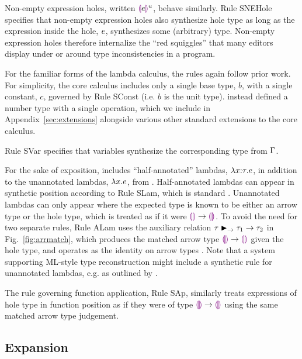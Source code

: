Non-empty expression holes, written $\textcolor{violet}{\llparenthesis}e\textcolor{violet}{\rrparenthesis}^{u}$, behave similarly. Rule {SNEHole} specifies that non-empty expression holes also synthesize hole type as long as the expression inside the hole, $e$, synthesizes some (arbitrary) type. Non-empty expression holes therefore internalize the ``red squiggles'' that many editors display under or around type inconsistencies in a program.

For the familiar forms of the lambda calculus, the rules again follow prior work. For simplicity, the core calculus includes only a single base type, $b$, with a single constant, $c$, governed by Rule {SConst} (i.e. $b$ is the unit type). \Hazelnut instead defined a number type with a single operation, which we include in Appendix~\ref{sec:extensions} alongside various other standard extensions to the core calculus. 

Rule {SVar} specifies that variables synthesize the corresponding type from $\Gamma$. 

For the sake of exposition, \HazelnutLive includes ``half-annotated'' lambdas, $\lambda x{:}\tau.e$, in addition to the unannotated lambdas, $\lambda x.e$, from \Hazelnut.  Half-annotated lambdas can appear in synthetic position  according to Rule {SLam}, which is standard \cite{Chlipala:2005da}. Unannotated lambdas can only appear where the expected type is known to be either an arrow type or the hole type, which is treated as if it were $\textcolor{violet}{\llparenthesis}\textcolor{violet}{\rrparenthesis} \rightarrow \textcolor{violet}{\llparenthesis}\textcolor{violet}{\rrparenthesis}$. To avoid the need for two separate rules, Rule {ALam} uses the auxiliary relation $\tau \blacktriangleright_{\rightarrow} \tau_1 \rightarrow \tau_2$ in Fig.~\ref{fig:arrmatch}, which produces the matched arrow type $\textcolor{violet}{\llparenthesis}\textcolor{violet}{\rrparenthesis} \rightarrow \textcolor{violet}{\llparenthesis}\textcolor{violet}{\rrparenthesis}$ given the hole type, and operates as the identity on arrow types \cite{DBLP:conf/snapl/SiekVCB15,DBLP:conf/popl/GarciaC15}. Note that a system supporting ML-style type reconstruction \cite{damas1982principal} might include a synthetic rule for unannotated lambdas, e.g. as outlined by \citet{DBLP:conf/icfp/DunfieldK13}. 

The rule governing function application, Rule {SAp}, similarly treats expressions of hole type in function position as if they were of type $\textcolor{violet}{\llparenthesis}\textcolor{violet}{\rrparenthesis} \rightarrow \textcolor{violet}{\llparenthesis}\textcolor{violet}{\rrparenthesis}$ using the same matched arrow type judgement.

\subsection{Expansion}
\label{sec:expansion}

